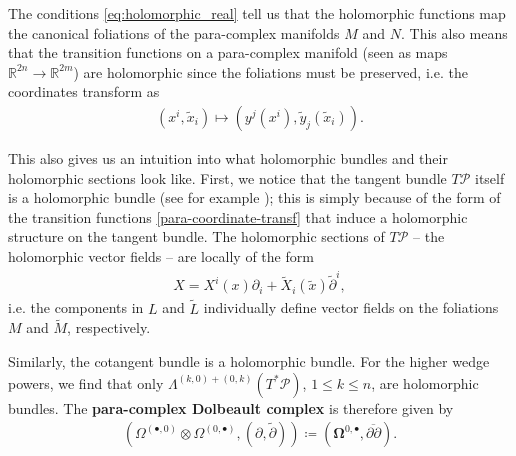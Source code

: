 \documentclass{article}
\newcommand{\RR}{\mathbb{R}}
\newcommand{\PS}{\mathcal{P}}
\newcommand{\ap}{\alpha}
\newcommand{\p}{\partial}
\newcommand{\pt}{\tilde{\partial}}
\newcommand{\xt}{{\tilde{x}}}
\newcommand{\rd}{\mathrm{d}}
\newcommand{\Lt}{\tl{L}}
\newcommand{\yt}{\tl{y}}
\newcommand{\Mt}{\tl{M}}
\newcommand{\pd}{\overline{\p\!\!\!\p}}
\def\tl{\tilde}
\newtheorem{lemma}[theorem]{Lemma}
\theoremstyle{definition}
\theoremstyle{remark}
\begin{document}
The conditions \eqref{eq:holomorphic_real} tell us that the holomorphic functions map the canonical foliations of the para-complex manifolds $M$ and $N$. This also means that the transition functions on a para-complex manifold (seen as maps $\RR^{2n}\rightarrow \RR^{2m}$) are holomorphic since the foliations must be preserved, i.e. the coordinates transform as
\begin{align}\label{para-coordinate-transf}
(x^i,\xt_i)\mapsto (y^j(x^i),\yt_j(\xt_i)).
\end{align}

This also gives us an intuition into what holomorphic bundles and their holomorphic sections look like. First, we notice that the tangent bundle $T\PS$ itself is a holomorphic bundle (see for example \cite{Cortes:2003zd,Hu:2019zro}); this is simply because of the form of the transition functions \eqref{para-coordinate-transf} that induce a holomorphic structure on the tangent bundle. The holomorphic sections of $T\PS$ -- the holomorphic vector fields -- are locally of the form
\begin{align*}
X= X^i(x)\p_i+\tl{X}_i(\xt)\pt^i,
\end{align*}
i.e. the components in $L$ and $\Lt$ individually define vector fields on the foliations $M$ and $\Mt$, respectively.  

Similarly, the cotangent bundle is a holomorphic bundle. For the higher wedge powers, we find that only $\Lambda^{(k,0)+(0,k)}(T^*\PS)$, $1\leq k\leq n$, are holomorphic bundles. The {\bf para-complex Dolbeault complex} is therefore given by
\begin{align}\label{para-dolbeault}
\left(\Omega^{(\bullet,0)}\otimes\Omega^{(0,\bullet)},(\p,\pt)\right)\coloneqq \left(\mathbf{\Omega}^{0,\bullet},\pd\right).
\end{align}


\end{document}
